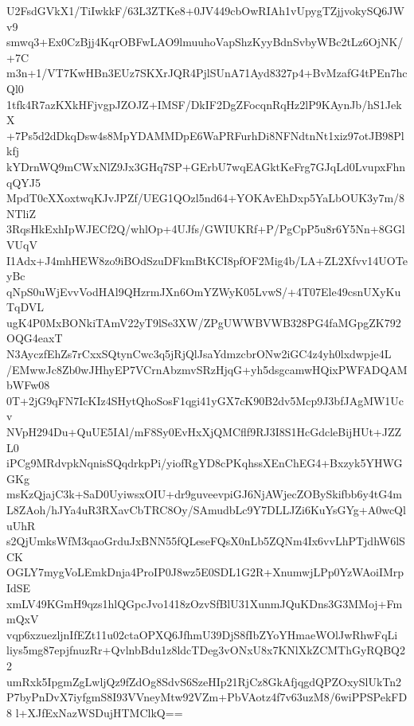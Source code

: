 U2FsdGVkX1/TiIwkkF/63L3ZTKe8+0JV449cbOwRIAh1vUpygTZjjvokySQ6JWv9
smwq3+Ex0CzBjj4KqrOBFwLAO9lmuuhoVapShzKyyBdnSvbyWBc2tLz6OjNK/+7C
m3n+1/VT7KwHBn3EUz7SKXrJQR4PjlSUnA71Ayd8327p4+BvMzafG4tPEn7hcQl0
1tfk4R7azKXkHFjvgpJZOJZ+IMSF/DkIF2DgZFocqnRqHz2lP9KAynJb/hS1JekX
+7Ps5d2dDkqDsw4s8MpYDAMMDpE6WaPRFurhDi8NFNdtnNt1xiz97otJB98Plkfj
kYDrnWQ9mCWxNlZ9Jx3GHq7SP+GErbU7wqEAGktKeFrg7GJqLd0LvupxFhnqQYJ5
MpdT0cXXoxtwqKJvJPZf/UEG1QOzl5nd64+YOKAvEhDxp5YaLbOUK3y7m/8NTliZ
3RqsHkExhIpWJECf2Q/whlOp+4UJfs/GWIUKRf+P/PgCpP5u8r6Y5Nn+8GGlVUqV
I1Adx+J4mhHEW8zo9iBOdSzuDFkmBtKCI8pfOF2Mig4b/LA+ZL2Xfvv14UOTeyBc
qNpS0uWjEvvVodHAl9QHzrmJXn6OmYZWyK05LvwS/+4T07Ele49csnUXyKuTqDVL
ugK4P0MxBONkiTAmV22yT9lSe3XW/ZPgUWWBVWB328PG4faMGpgZK792OQG4eaxT
N3AyczfEhZs7rCxxSQtynCwc3q5jRjQlJsaYdmzcbrONw2iGC4z4yh0lxdwpje4L
/EMwwJc8Zb0wJHhyEP7VCrnAbzmvSRzHjqG+yh5dsgcamwHQixPWFADQAMbWFw08
0T+2jG9qFN7IcKIz4SHytQhoSosF1qgi41yGX7cK90B2dv5Mcp9J3bfJAgMW1Ucv
NVpH294Du+QuUE5IAl/mF8Sy0EvHxXjQMCflf9RJ3I8S1HcGdcleBijHUt+JZZL0
iPCg9MRdvpkNqnisSQqdrkpPi/yiofRgYD8cPKqhssXEnChEG4+Bxzyk5YHWGGKg
msKzQjajC3k+SaD0UyiwsxOIU+dr9guveevpiGJ6NjAWjecZOBySkifbb6y4tG4m
L8ZAoh/hJYa4uR3RXavCbTRC8Oy/SAmudbLc9Y7DLLJZi6KuYsGYg+A0wcQluUhR
s2QjUmksWfM3qaoGrduJxBNN55fQLeseFQsX0nLb5ZQNm4Ix6vvLhPTjdhW6lSCK
OGLY7mygVoLEmkDnja4ProIP0J8wz5E0SDL1G2R+XnumwjLPp0YzWAoiIMrpIdSE
xmLV49KGmH9qzs1hlQGpcJvo1418zOzvSfBlU31XunmJQuKDns3G3MMoj+FmmQxV
vqp6xzuezljnIfEZt11u02ctaOPXQ6JfhmU39DjS8fIbZYoYHmaeWOlJwRhwFqLi
liys5mg87epjfnuzRr+QvlnbBdu1z8ldcTDeg3vONxU8x7KNlXkZCMThGyRQBQ22
umRxk5IpgmZgLwljQz9fZdOg8SdvS6SzeHIp21RjCz8GkAfjqgdQPZOxySlUkTn2
P7byPnDvX7iyfgmS8I93VVneyMtw92VZm+PbVAotz4f7v63uzM8/6wiPPSPekFD8
l+XJfExNazWSDujHTMClkQ==
